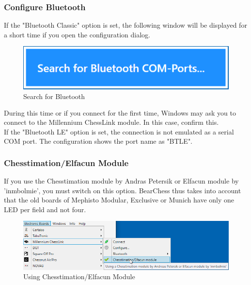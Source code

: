 \documentclass[11pt,a4paper]{article}
\begin{document}
\subsubsection{Configure Bluetooth} \label{Bluetooth}

If the "Bluetooth Classic" option is set, the following window will be displayed for a short time if you open the configuration dialog.

\begin{figure}[H]
	\centering
	\includegraphics[scale=0.8]{MillenniumChessLink10.png}
	\caption{Search for Bluetooth}
	\label{fig:MillenniumChessLink10}
\end{figure}



During this time or if you connect for the first time, Windows may ask you to connect to the Millennium ChessLink module. In this case, confirm this.\\

If the "Bluetooth LE" option is set, the connection is not emulated as a serial COM port. The configuration shows the port name as "BTLE".

\subsubsection{Chesstimation/Elfacun Module}
If you use the Chesstimation module by Andras Petersik or Elfacun module by 'inmbolmie', you must switch on this option.
BearChess thus takes into account that the old boards of Mephisto Modular, Exclusive or Munich have only one LED per field and not four.
\begin{figure}[H]
	\centering
	\includegraphics[scale=0.6]{MillenniumChessLink13.png}
	\caption{Using Chesstimation/Elfacun Module}
	\label{fig:MillenniumChessLink13}
\end{figure}
\end{document}

